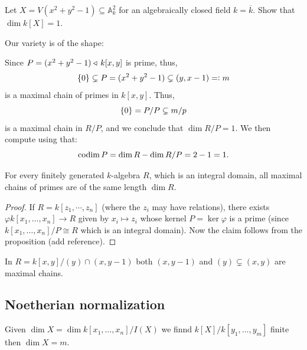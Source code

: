 \documentclass[11pt,a4paper]{article}
\newcommand{\A}{\mathbb A}
\begin{document}
\begin{exercise}
  Let $X = V(x^2 + y^2 - 1) \subseteq \A_k^2$ for an algebraically
  closed field $k = \overline k$.
  Show that $\dim k[X] = 1$.
\end{exercise}
\begin{solution}
  Our variety is of the shape:
  \begin{center}
  \end{center}
  Since $P = (x^2 + y^2 - 1) \triangleleft\, k[x,y]$ is prime,
  thus,
  \[
    \left\{0\right\} \subsetneq P = (x^2 + y^2 - 1) \subsetneq (y, x - 1) =: m
  \]
  is a maximal chain of primes in $k[x,y]$.
  Thus,
  \[
    \left\{0\right\} = P/P \subsetneq m/p
  \]
  is a maximal chain in $R/P$,
  and we conclude that $\dim R/P = 1$.
  We then compute using 
  that:
  \[
    \operatorname{codim} P = \dim R - \dim R/P = 2 - 1 = 1.
  \]
\end{solution}

\begin{corollary}
  For every finitely generated $k$-algebra $R$,
  which is an integral domain,
  all maximal chains of primes are of the same length $\dim R$.
\end{corollary}
\begin{proof}
  If $R = k[z_1,\cdots,z_n]$ (where the $z_i$ may have relations),
  there exists $\varphi k[x_1,\dots,x_n] \to R$
  given by $x_i \mapsto z_i$
  whose kernel $P = \ker \varphi$ is a prime
  (since $k[x_1,\dots,x_n]/P \cong R$ which is an integral domain).
  Now the claim follows from the proposition (add reference).
\end{proof}

\begin{example}
  In $R = k[x,y] / (y) \cap (x, y - 1)$
  both $(x, y - 1)$ and $(y) \subsetneq (x,y)$ are maximal chains.
\end{example}


\subsection{Noetherian normalization}

\begin{definition}
    Given $\dim X = \dim k[x_1,\dots,x_n]/I(X)$
    we finnd $k[X]/k[y_1,\dots,y_m]$ finite
    then $\dim X = m$.
\end{definition}
\end{document}
